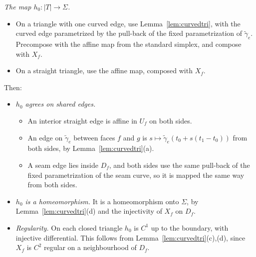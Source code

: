 \emph{The map $h_0\colon|T|\to\Sigma$.}
\begin{itemize}
\item On a triangle with one curved edge, use Lemma~\ref{lem:curvedtri}, with the curved edge parametrized by the
pull-back of the fixed parametrization of $\tilde\gamma_e$. Precompose with the affine map from the standard simplex,
and compose with $X_f$.
\item On a straight triangle, use the affine map, composed with $X_f$.
\end{itemize}
Then:
\begin{itemize}
\item \emph{$h_0$ agrees on shared edges.}
  \begin{itemize}
  \item An interior straight edge is affine in $U_f$ on both sides.
  \item An edge on $\tilde\gamma_e$ between faces $f$ and $g$ is $s\mapsto\tilde\gamma_e(t_0+s(t_1-t_0))$ from both
  sides, by Lemma~\ref{lem:curvedtri}(a).
  \item A seam edge lies inside $D_f$, and both sides use the same pull-back of the fixed parametrization of the
  seam curve, so it is mapped the same way from both sides.
  \end{itemize}
\item \emph{$h_0$ is a homeomorphism.} It is a homeomorphism onto $\Sigma$, by Lemma~\ref{lem:curvedtri}(d) and the
injectivity of $X_f$ on $D_f$.
\item \emph{Regularity.} On each closed triangle $h_0$ is $C^1$ up to the boundary, with injective differential. This
follows from Lemma~\ref{lem:curvedtri}(c),(d), since $X_f$ is $C^2$ regular on a neighbourhood of $D_f$.
\end{itemize}

